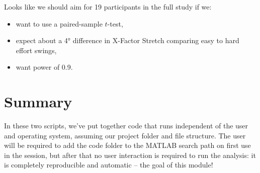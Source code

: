 \documentclass[12pt,a4paper]{article}
\begin{document}
Looks like we should aim for 19 participants in the full study if we:
\begin{itemize}
	\item want to use a paired-sample $t$-test,
	\item expect about a 4° difference in X-Factor Stretch comparing easy to hard effort swings,
	\item want power of 0.9.
\end{itemize}

\section{Summary}

In these two scripts, we've put together code that runs independent of the user and operating system, assuming our project folder and file structure.
The user will be required to add the code folder to the MATLAB search path on first use in the session, but after that no user interaction is required to run the analysis: it is completely reproducible and automatic – the goal of this module!
\end{document}
